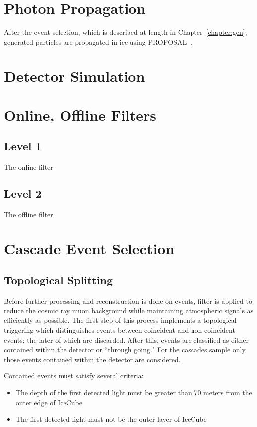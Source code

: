 \documentclass[main.tex]{subfiles}
\begin{document}
\section{Photon Propagation}

After the event selection, which is described at-length in Chapter~\ref{chapter:gen}, generated particles are propagated in-ice using PROPOSAL~\cite{Koehne:2013gpa}. 

\section{Detector Simulation}

\section{Online, Offline Filters}

\subsection{Level 1}

The online filter

\subsection{Level 2}

The offline filter 


\section{Cascade Event Selection}

\subsection{Topological Splitting}

Before further processing and reconstruction is done on events, filter is applied to reduce the cosmic ray muon background while maintaining atmospheric signals as efficiently as possible. 
The first step of this process implements a topological triggering which distinguishes events between coincident and non-coincident events; the later of which are discarded. 
After this, events are classified as either contained within the detector or ``through going." For the cascades sample only those events contained within the detector are considered. 

Contained events must satisfy several criteria:
\begin{itemize}
    \item The depth of the first detected light must be greater than 70 meters from the outer edge of IceCube
    \item The first detected light must not be the outer layer of IceCube
\end{itemize}
\end{document}
